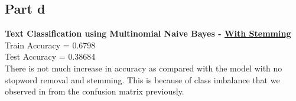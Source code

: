 \documentclass[12pt]{article}
\begin{document}
\subsection*{Part d}
\begin{addmargin}[0.3in]{0in}
\textbf{Text Classification using Multinomial Naive Bayes - \underline{With Stemming}}\\
Train Accuracy = 0.6798\\
Test Accuracy = 0.38684\\
There is not much increase in accuracy as compared with the model with no stopword removal and stemming. This is because of class imbalance that we observed in from the confusion matrix previously.
\end{addmargin}
\end{document}
